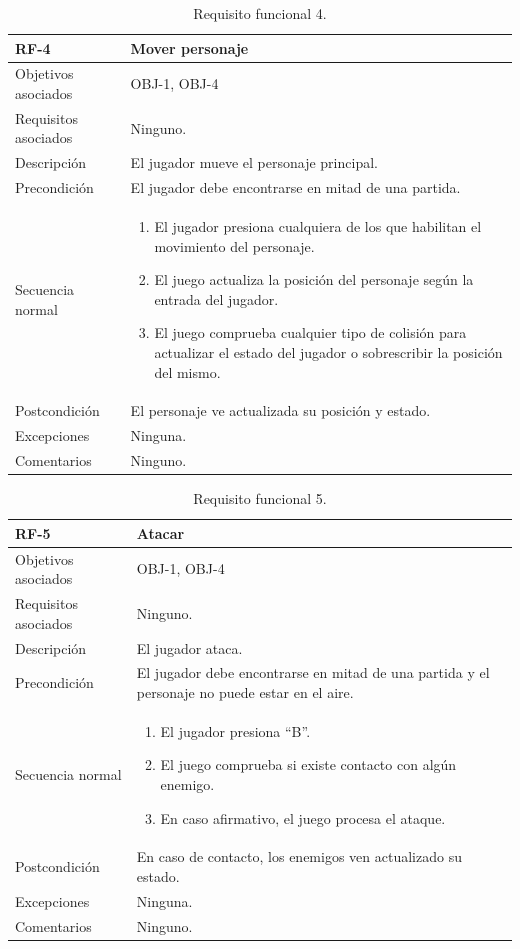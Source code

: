 \begin{table}[h]
	\centering
	\begin{tabular}{| l | p{11cm} |}
		\hline
		\textbf{RF-4} & \textbf{Mover personaje} \\ \hline
		Objetivos asociados & OBJ-1, OBJ-4 \\ \hline
		Requisitos asociados & Ninguno. \\ \hline
		Descripción & El jugador mueve el personaje principal. \\ \hline
		Precondición & El jugador debe encontrarse en mitad de una partida.  \\ \hline
		Secuencia normal & 
		\begin{enumerate}
			\item El jugador presiona cualquiera de los que habilitan el movimiento del personaje.
			\item El juego actualiza la posición del personaje según la entrada del jugador.
			\item El juego comprueba cualquier tipo de colisión para actualizar el estado del jugador o sobrescribir la posición del mismo.
		\end{enumerate}
		\\ \hline
		Postcondición & El personaje ve actualizada su posición y estado. \\ \hline
		Excepciones & Ninguna. \\ \hline
		Comentarios & Ninguno. \\ \hline
	\end{tabular}
	\caption{Requisito funcional 4.}\label{tab:rf-4}
\end{table}

\begin{table}[h]
	\centering
	\begin{tabular}{| l | p{11cm} |}
		\hline
		\textbf{RF-5} & \textbf{Atacar} \\ \hline
		Objetivos asociados & OBJ-1, OBJ-4 \\ \hline
		Requisitos asociados & Ninguno. \\ \hline
		Descripción & El jugador ataca. \\ \hline
		Precondición & El jugador debe encontrarse en mitad de una partida y el personaje no puede estar en el aire.  \\ \hline
		Secuencia normal & 
		\begin{enumerate}
			\item El jugador presiona ``B''.
			\item El juego comprueba si existe contacto con algún enemigo.
			\item En caso afirmativo, el juego procesa el ataque.
		\end{enumerate}
		\\ \hline
		Postcondición & En caso de contacto, los enemigos ven actualizado su estado. \\ \hline
		Excepciones & Ninguna. \\ \hline
		Comentarios & Ninguno. \\ \hline
	\end{tabular}
	\caption{Requisito funcional 5.}\label{tab:rf-5}
\end{table}

